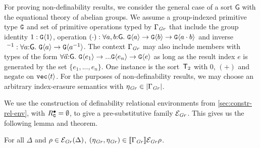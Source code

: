 For proving non-definability results, we consider the general case of
a sort $\mathsf{G}$ with the equational theory of abelian groups. We
assume a group-indexed primitive type $\textup{\texttt{G}}$ and set of
primitive operations typed by $\Gamma_{\mathit{Gr}}$ that include the group
identity $1:\textup{\texttt{G}}\langle 1 \rangle$, operation $(\cdot): \forall
a,b\mathord:\mathsf{G}.\ \textup{\texttt{G}}\langle a \rangle \to \textup{\texttt{G}}\langle b \rangle \to
\textup{\texttt{G}}\langle a\cdot b \rangle$ and inverse $\ ^{-1}: \forall
a\mathord:\mathsf{G}.\ \tyPrim{G}{a} \to \tyPrim{G}{a^{-1}}$. The
context $\Gamma_{\mathit{Gr}}$ may also include members with types of the form
$\forall \vec{a}\mathord:\mathsf{G}.\ \textup{\texttt{G}}\langle e_1 \rangle \to ...
\textup{\texttt{G}}\langle e_n \rangle \to \textup{\texttt{G}}\langle e \rangle$ as long as the result index $e$ is
generated by the set $\{e_1,...,e_n\}$. One instance is the
sort~$\mathsf{T}_2$ with $0$, $(+)$ and $\mathrm{negate}$ on
$\textup{\texttt{vec}}\langle t \rangle$. For the purposes of non-definability results, we
may choose an arbitrary index-erasure semantics with $\eta_{\mathit{Gr}} \in
\left| \Gamma_{\mathit{Gr}}\right|$.

We use the construction of definability relational environments
from \autoref{sec:constr-rel-env}, with $R^\bullet_{\textup{\texttt{G}}} =
\emptyset$, to give a pre-substitutive family $\mathcal{E}_{\mathit{Gr}}$. This
gives us the following lemma and theorem.

\begin{lemma}\label{lem:geom-environments-2}
  For all $\Delta$ and $\rho \in \mathcal{E}_{\mathit{Gr}}(\Delta)$,
  $(\eta_{\mathit{Gr}},\eta_{\mathit{Gr}}) \in \llbracket \Gamma_{\mathit{Gr}} \rrbracket{\mathcal{E}_{\mathit{Gr}}}\rho$.
\end{lemma}



